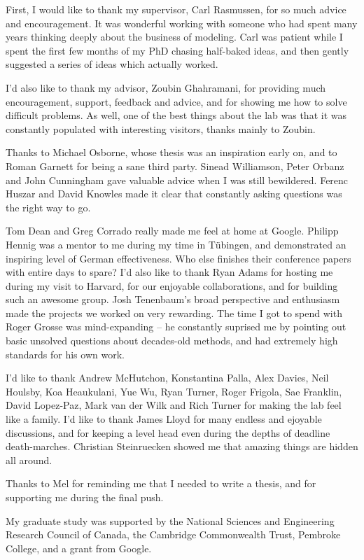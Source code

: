 
\begin{acknowledgements}      


First, I would like to thank my supervisor, Carl Rasmussen, for so much advice and encouragement.
It was wonderful working with someone who had spent many years thinking deeply about the business of modeling.
Carl was patient while I spent the first few months of my PhD chasing half-baked ideas, and then gently suggested a series of ideas which actually worked.

I'd also like to thank my advisor, Zoubin Ghahramani, for providing much encouragement, support, feedback and advice, and for showing me how to solve difficult problems.
As well, one of the best things about the lab was that it was constantly populated with interesting visitors, thanks mainly to Zoubin.

Thanks to Michael Osborne, whose thesis was an inspiration early on, and to Roman Garnett for being a sane third party.
Sinead Williamson, Peter Orbanz and John Cunningham gave valuable advice when I was still bewildered.
Ferenc Huszar and David Knowles made it clear that constantly asking questions was the right way to go.

Tom Dean and Greg Corrado really made me feel at home at Google.
Philipp Hennig was a mentor to me during my time in T\"{u}bingen, and demonstrated an inspiring level of German effectiveness.
Who else finishes their conference papers with entire days to spare?
I'd also like to thank Ryan Adams for hosting me during my visit to Harvard, for our enjoyable collaborations, and for building such an awesome group.
Josh Tenenbaum's broad perspective and enthusiasm made the projects we worked on very rewarding.
The time I got to spend with Roger Grosse was mind-expanding -- he constantly suprised me by pointing out basic unsolved questions about decades-old methods, and had extremely high standards for his own work.

I'd like to thank Andrew McHutchon, Konstantina Palla, Alex Davies, Neil Houlsby, Koa Heaukulani, Yue Wu, Ryan Turner, Roger Frigola, Sae Franklin, David Lopez-Paz, Mark van der Wilk and Rich Turner for making the lab feel like a family.
I'd like to thank James Lloyd for many endless and ejoyable discussions, and for keeping a level head even during the depths of deadline death-marches.
Christian Steinruecken showed me that amazing things are hidden all around.

Thanks to Mel for reminding me that I needed to write a thesis, and for supporting me during the final push.

My graduate study was supported by the National Sciences and Engineering Research Council of Canada, the Cambridge Commonwealth Trust, Pembroke College, and a grant from Google.

\end{acknowledgements}
